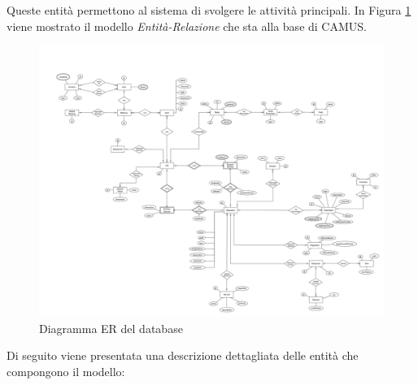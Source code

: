 Queste entità permettono al sistema di svolgere le attività principali. In Figura \ref{fig:schema-er-db} viene mostrato il modello \emph{Entità-Relazione} che sta alla base di CAMUS.

\begin{figure}[ht]
	\centering
	\includegraphics[width=\textwidth]{5-implementazione-backend/Immagini/schema_er_db.png}
	\caption{Diagramma ER del database}\label{fig:schema-er-db}
\end{figure}

Di seguito viene presentata una descrizione dettagliata delle entità che compongono il modello:

